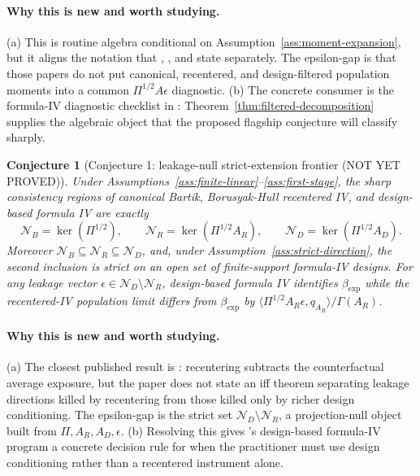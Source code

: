 \documentclass[11pt]{article}
\theoremstyle{definition}
\theoremstyle{plain}
\newtheorem{conjecture}{Conjecture}
\theoremstyle{remark}
\begin{document}
\paragraph{Why this is new and worth studying.}
(a) This is routine algebra conditional on Assumption~\ref{ass:moment-expansion}, but it aligns the notation that \citet{BorusyakHullJaravel2022REStud}, \citet{BorusyakHull2023Econometrica}, and \citet{BorusyakHullJaravel2025ECTJ} state separately.  The epsilon-gap is that those papers do not put canonical, recentered, and design-filtered population moments into a common \(\Pi^{1/2}A\epsilon\) diagnostic.  (b) The concrete consumer is the formula-IV diagnostic checklist in \citet{BorusyakHullJaravel2025ECTJ}: Theorem~\ref{thm:filtered-decomposition} supplies the algebraic object that the proposed flagship conjecture will classify sharply.

\begin{conjecture}[Conjecture 1: leakage-null strict-extension frontier (NOT YET PROVED)]\label{conj:leakage-null-frontier}
Under Assumptions~\ref{ass:finite-linear}--\ref{ass:first-stage}, the sharp consistency regions of canonical Bartik, Borusyak-Hull recentered IV, and design-based formula IV are exactly
\[
  \mathcal N_B=\ker(\Pi^{1/2}),\qquad
  \mathcal N_R=\ker(\Pi^{1/2}A_R),\qquad
  \mathcal N_D=\ker(\Pi^{1/2}A_D).
\]
Moreover \(\mathcal N_B\subseteq\mathcal N_R\subseteq\mathcal N_D\), and, under Assumption~\ref{ass:strict-direction}, the second inclusion is strict on an open set of finite-support formula-IV designs.  For any leakage vector \(\epsilon\in\mathcal N_D\setminus\mathcal N_R\), design-based formula IV identifies \(\beta_{\exp}\) while the recentered-IV population limit differs from \(\beta_{\exp}\) by \(\langle \Pi^{1/2}A_R\epsilon,q_{A_R}\rangle/\Gamma(A_R)\).
\end{conjecture}
\paragraph{Why this is new and worth studying.}
(a) The closest published result is \citet{BorusyakHull2023Econometrica}: recentering subtracts the counterfactual average exposure, but the paper does not state an iff theorem separating leakage directions killed by recentering from those killed only by richer design conditioning.  The epsilon-gap is the strict set \(\mathcal N_D\setminus\mathcal N_R\), a projection-null object built from \(\Pi,A_R,A_D,\epsilon\).  (b) Resolving this gives \citet{BorusyakHullJaravel2025ECTJ}'s design-based formula-IV program a concrete decision rule for when the practitioner must use design conditioning rather than a recentered instrument alone.
\end{document}
